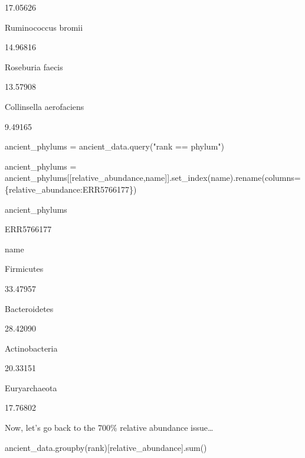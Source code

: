 \documentclass[
  letterpaper,
]{book}
\newenvironment{Shaded}{}{}
\newcommand{\BuiltInTok}[1]{\textcolor[rgb]{0.84,0.23,0.29}{#1}}
\newcommand{\NormalTok}[1]{\textcolor[rgb]{0.14,0.16,0.18}{#1}}
\newcommand{\OperatorTok}[1]{\textcolor[rgb]{0.14,0.16,0.18}{#1}}
\newcommand{\StringTok}[1]{\textcolor[rgb]{0.01,0.18,0.38}{#1}}
\begin{document}
17.05626

Ruminococcus bromii

14.96816

Roseburia faecis

13.57908

Collinsella aerofaciens

9.49165

\begin{Shaded}
\begin{Highlighting}[]
\NormalTok{ancient\_phylums }\OperatorTok{=}\NormalTok{ ancient\_data.query(}\StringTok{"rank == \textquotesingle{}phylum\textquotesingle{}"}\NormalTok{)}
\end{Highlighting}
\end{Shaded}

\begin{Shaded}
\begin{Highlighting}[]
\NormalTok{ancient\_phylums }\OperatorTok{=}\NormalTok{ ancient\_phylums[[}\StringTok{\textquotesingle{}relative\_abundance\textquotesingle{}}\NormalTok{,}\StringTok{\textquotesingle{}name\textquotesingle{}}\NormalTok{]].set\_index(}\StringTok{\textquotesingle{}name\textquotesingle{}}\NormalTok{).rename(columns}\OperatorTok{=}\NormalTok{\{}\StringTok{\textquotesingle{}relative\_abundance\textquotesingle{}}\NormalTok{:}\StringTok{\textquotesingle{}ERR5766177\textquotesingle{}}\NormalTok{\})}
\end{Highlighting}
\end{Shaded}

\begin{Shaded}
\begin{Highlighting}[]
\NormalTok{ancient\_phylums}
\end{Highlighting}
\end{Shaded}

ERR5766177

name

Firmicutes

33.47957

Bacteroidetes

28.42090

Actinobacteria

20.33151

Euryarchaeota

17.76802

Now, let's go back to the 700\% relative abundance issue\ldots{}

\begin{Shaded}
\begin{Highlighting}[]
\NormalTok{ancient\_data.groupby(}\StringTok{\textquotesingle{}rank\textquotesingle{}}\NormalTok{)[}\StringTok{\textquotesingle{}relative\_abundance\textquotesingle{}}\NormalTok{].}\BuiltInTok{sum}\NormalTok{()}
\end{Highlighting}
\end{Shaded}
\end{document}

